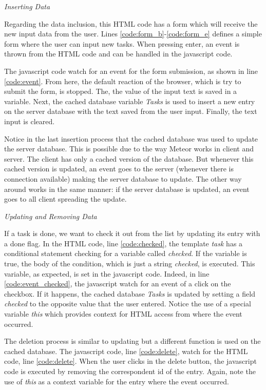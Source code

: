 \emph{Inserting Data}

Regarding the data inclusion, this HTML code has a form which will receive the new input data from the user.
Lines \ref{code:form_b}-\ref{code:form_e} defines a simple form where the user can input new tasks.
When pressing enter, an event is thrown from the HTML code and can be handled in the javascript code.

The javascript code watch for an event for the form submission, as shown in line \ref{code:event}.
From here, the default reaction of the browser, which is try to submit the form, is stopped.
The, the value of the input text is saved in a variable.
Next, the cached database variable \emph{Tasks} is used to insert a new entry on the server database with the text saved from the user input.
Finally, the text input is cleared.

Notice in the last insertion process that the cached database was used to update the server database.
This is possible due to the way Meteor works in client and server.
The client has only a cached version of the database.
But whenever this cached version is updated, an event goes to the server (whenever there is connection available) making the server database to update.
The other way around works in the same manner: if the server database is updated, an event goes to all client spreading the update.

\emph{Updating and Removing Data}

If a task is done, we want to check it out from the list by updating its entry with a done flag.
In the HTML code, line \ref{code:checked}, the template \emph{task} has a conditional statement checking for a variable called \emph{checked}.
If the variable is true, the body of the condition, which is just a string \emph{checked}, is executed.
This variable, as expected, is set in the javascript code.
Indeed, in line \ref{code:event_checked}, the javascript watch for an event of a click on the checkbox.
If it happens, the cached database \emph{Tasks} is updated by setting a field \emph{checked} to the opposite value that the user entered.
Notice the use of a special variable \emph{this} which provides context for HTML access from where the event occurred.


The deletion process is similar to updating but a different function is used on the cached database.
The javascript code, line \ref{code:delete}, watch for the HTML code, line \ref{code:delete}.
When the user clicks in the delete button, the javascript code is executed by removing the correspondent id of the entry.
Again, note the use of \emph{this} as a context variable for the entry where the event occurred.

